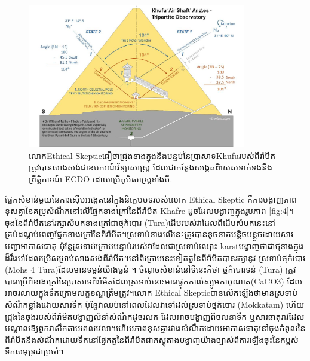 \documentclass[10pt,twocolumn,letterpaper]{article}
\begin{document}
\begin{figure}[b]
\begin{center}
\includegraphics[width=0.85\textwidth]{shafts.jpg}
\end{center}
   \caption{លោកEthical Skepticជឿថាជ្រុងខាងក្នុងនិងបន្ទប់នៃប្រាសាទKhufuរបស់ពីរ៉ាមីតត្រូវបានសាងសង់ជាឧបករណ៍វិទ្យាសាស្ត្រ ដែលជាកន្លែងសង្កេតពិសេសទាក់ទងនឹងព្រឹត្តិការណ៍ ECDO ដោយប្រើភូមិសាស្ត្រទាំងបី\cite{28}.}
\label{fig:5}
\end{figure}

ផ្នែកសំខាន់មួយនៃការស៊ើបអង្កេតនៅក្នុងនិក្ខេបបទរបស់លោក Ethical Skeptic 
គឺការបង្ហាញភាពខុសគ្នានៃគម្រូសំណឹកនៅលើផ្នែកខាងក្រៅនៃពីរ៉ាមីត Khafre ដូចដែលបង្ហាញក្នុងរូបភាព \ref{fig:4}។ ចុងនៃពីរ៉ាមីតនៅរក្សាសំបកខាងក្រៅជាថ្មកំបោរ (Tura)ដើមរបស់វា​ដែលពីដើមសំបកនេះនៅគ្រប់ដណ្តប់ពេញផ្នែកខាងក្រៅនៃពីរ៉ាមីត។ស្រទាប់ខាងលើនេះត្រូវបានខូចខាតបន្តិចបន្តួចដោយសារបញ្ហាអាកាសធាតុ ប៉ុន្តែស្រទាប់ក្រោមបន្ទាប់របស់វាដែលជាស្រទាប់ឈ្មោះ karst​បង្ហាញថាជាថ្មខាងក្នុងដ៏រឹងមាំដែលប្រើសម្រាប់សាងសង់ពីរ៉ាមីត។​នៅពីក្រោមនេះទៀត​ តួនៃពីរ៉ាមីតបានរក្សា​នូវ​
ស្រទាប់ថ្មកំបោរ (Mohs 4 Tura)ដែលមានទម្ងន់យ៉ាងធ្ងន់ ។ ចំណុចសំខាន់នៅទីនេះគឺថា ថ្មកំបោរទន់ (Tura) ត្រូវបានប្រើពីខាងក្រៅនៃប្រាសាទពីរ៉ាមីតដែលស្រទាប់នោះមានផ្ទុកកាល់ស្យូមកាបូណាត(CaCO3) ដែលអាចរលាយក្នុងទឹកក្រោមលក្ខខណ្ឌត្រឹមត្រូវ។លោក Ethical Skepticបានលើកឡើងថាមានស្រទាប់សំណឹកខ្លាំងដោយសារទឹក ប៉ុន្តែវាឈប់នៅពេលដែលវាទៅដល់ស្រទាប់ថ្មកំបោរ (Mokkatam) ហើយជ្រុងនៃចុងរបស់ពីរ៉ាមីតបង្ហាញលំនាំសំណឹកដូចរលក ដែលអាចបង្ហាញពីចលនាទឹក ឬសារធាតុរាវដែលបណ្តាលឱ្យពួកវាសឹកតាមពេលវេលា។​ហើយភាពខុសគ្នារវាងសំណឹកដោយអាកាសធាតុនៅចុងកំពូលនៃពីរ៉ាមីត​និងសំណឹកដោយទឹកនៅផ្នែកតួនៃពីរ៉ាមីត​ជាភស្តុតាងបង្ហាញយ៉ាងច្បាស់ពីការឡើងចុះនៃកម្ពស់ទឹកសមុទ្រជាប្រចាំ\cite{27}។
\end{document}
